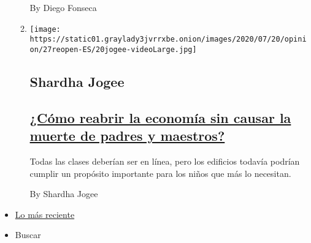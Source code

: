 \begin{enumerate}
\begin{enumerate}
    By Diego Fonseca
  \item
    \texttt{[image: https://static01.graylady3jvrrxbe.onion/images/2020/07/20/opinion/27reopen-ES/20jogee-videoLarge.jpg]}

    \hypertarget{shardha-jogee}{%
    \subsection{Shardha Jogee}\label{shardha-jogee}}

    \hypertarget{cuxf3mo-reabrir-la-economuxeda-sin-causar-la-muerte-de-padres-y-maestros}{%
    \subsection{\texorpdfstring{\href{/es/2020/07/27/espanol/opinion/reabrir-escuelas-riesgo-covid.html}{¿Cómo
    reabrir la economía sin causar la muerte de padres y
    maestros?}}{¿Cómo reabrir la economía sin causar la muerte de padres y maestros?}}\label{cuxf3mo-reabrir-la-economuxeda-sin-causar-la-muerte-de-padres-y-maestros}}

    Todas las clases deberían ser en línea, pero los edificios todavía
    podrían cumplir un propósito importante para los niños que más lo
    necesitan.

    By Shardha Jogee
  \end{enumerate}
\end{enumerate}

\begin{itemize}
\tightlist
\item
  \protect\hyperlink{stream-panel}{Lo más reciente}
\item
  Buscar
\end{itemize}

